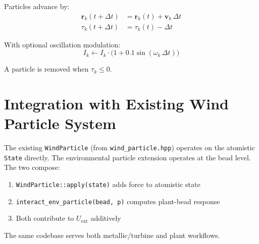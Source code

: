 \documentclass[11pt]{article}
\begin{document}
Particles advance by:
\begin{align}
  \mathbf{r}_k(t + \Delta t) &= \mathbf{r}_k(t) + \mathbf{v}_k\,\Delta t \\
  \tau_k(t + \Delta t) &= \tau_k(t) - \Delta t
\end{align}

With optional oscillation modulation:
\begin{equation}
  I_k \leftarrow I_k \cdot \bigl(1 + 0.1\sin(\omega_k\,\Delta t)\bigr)
\end{equation}

A particle is removed when $\tau_k \leq 0$.

\section{Integration with Existing Wind Particle System}

The existing \texttt{WindParticle} (from \texttt{wind\_particle.hpp})
operates on the atomistic \texttt{State} directly.  The environmental
particle extension operates at the bead level.  The two compose:

\begin{enumerate}
  \item \texttt{WindParticle::apply(state)} adds force to atomistic state
  \item \texttt{interact\_env\_particle(bead, p)} computes plant-bead response
  \item Both contribute to $U_{\mathrm{ext}}$ additively
\end{enumerate}

The same codebase serves both metallic/turbine and plant workflows.
\end{document}
